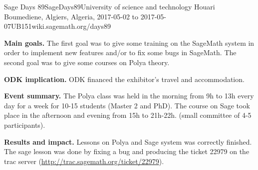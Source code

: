 \begin{event}{Sage Days 89}{SageDays89}{University of science and technology Houari Boumediene, Algiers, Algeria, 2017-05-02 to 2017-05-07}{UB}{15}{1}{wiki.sagemath.org/days89}

\textbf{Main goals.} The first goal was to give some training on the SageMath system in order to implement new features  and/or to fix some bugs in SageMath. The second goal was to give some courses on Polya theory.

\textbf{ODK implication.} 
ODK financed the exhibitor's travel and accommodation.

\textbf{Event summary.} 
The Polya class was held in the morning from 9h to 13h every day for a week
for 10-15 students (Master 2 and PhD).
The course on Sage took place in the afternoon and evening from 15h to 21h-22h. (small committee of 4-5 participants).

\textbf{Results and impact.} Lessons on Polya and Sage system was correctly finished. The sage lesson was done by fixing a bug and producing the ticket 22979 on the trac server (\url{http://trac.sagemath.org/ticket/22979}).

\end{event}

